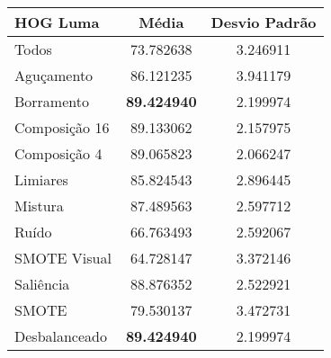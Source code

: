 

\begin{table}[!htbp]
\centering
\caption{}
\label{tab:resultados:x:melhor}
\begin{tabular}{|l|c|c|}
\hline
\textbf{HOG Luma} & \textbf{Média}     & \textbf{Desvio Padrão} \\ \hline
   Todos        &  73.782638 &  3.246911  \\ \hline
  Aguçamento    &  86.121235 &  3.941179  \\ \hline
  Borramento    &  \textbf{89.424940} &  2.199974  \\ \hline
  Composição 16 &  89.133062 &  2.157975  \\ \hline
  Composição 4  &  89.065823 &  2.066247  \\ \hline
  Limiares      &  85.824543 &  2.896445  \\ \hline
  Mistura       &  87.489563 &  2.597712  \\ \hline
  Ruído         &  66.763493 &  2.592067  \\ \hline
  SMOTE Visual  &  64.728147 &  3.372146  \\ \hline
  Saliência     &  88.876352 &  2.522921  \\ \hline
 SMOTE          &  79.530137 &  3.472731  \\ \hline
Desbalanceado   &  \textbf{89.424940} &  2.199974  \\ \hline
\end{tabular}
\end{table}

